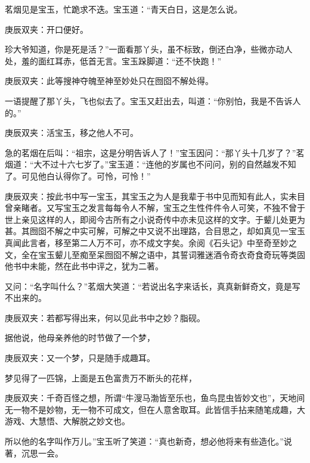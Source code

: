 \begin{parag}
    茗烟见是宝玉，忙跪求不迭。宝玉道：“青天白日，这是怎么说。\begin{note}庚辰双夹：开口便好。\end{note}珍大爷知道，你是死是活？”一面看那丫头，虽不标致，倒还白净，些微亦动人处，羞的面红耳赤，低首无言。宝玉跺脚道：“还不快跑！”\begin{note}庚辰双夹：此等搜神夺魄至神至妙处只在囫囵不解处得。\end{note}一语提醒了那丫头，飞也似去了。宝玉又赶出去，叫道：“你别怕，我是不告诉人的。”\begin{note}庚辰双夹：活宝玉，移之他人不可。\end{note}急的茗烟在后叫：“祖宗，这是分明告诉人了！”宝玉因问：“那丫头十几岁了？”茗烟道：“大不过十六七岁了。”宝玉道：“连他的岁属也不问问，别的自然越发不知了。可见他白认得你了。可怜，可怜！”\begin{note}庚辰双夹：按此书中写一宝玉，其宝玉之为人是我辈于书中见而知有此人，实未目曾亲睹者。又写宝玉之发言每每令人不解，宝玉之生性件件令人可笑，不独不曾于世上亲见这样的人，即阅今古所有之小说奇传中亦未见这样的文字。于颦儿处更为甚。其囫囵不解之中实可解，可解之中又说不出理路，合目思之，却如真见一宝玉真闻此言者，移至第二人万不可，亦不成文字矣。余阅《石头记》中至奇至妙之文，全在宝玉颦儿至痴至呆囫囵不解之语中，其誓词雅迷酒令奇衣奇食奇玩等类固他书中未能，然在此书中评之，犹为二著。\end{note}又问：“名字叫什么？”茗烟大笑道：“若说出名字来话长，真真新鲜奇文，竟是写不出来的。\begin{note}庚辰双夹：若都写得出来，何以见此书中之妙？脂砚。\end{note}据他说，他母亲养他的时节做了一个梦，\begin{note}庚辰双夹：又一个梦，只是随手成趣耳。\end{note}梦见得了一匹锦，上面是五色富贵万不断头的花样，\begin{note}庚辰双夹：千奇百怪之想，所谓“牛溲马渤皆至乐也，鱼鸟昆虫皆妙文也”，天地间无一物不是妙物，无一物不可成文，但在人意舍取耳。此皆信手拈来随笔成趣，大游戏、大慧悟、大解脱之妙文也。\end{note}所以他的名字叫作万儿。”宝玉听了笑道：“真也新奇，想必他将来有些造化。”说著，沉思一会。
\end{parag}


